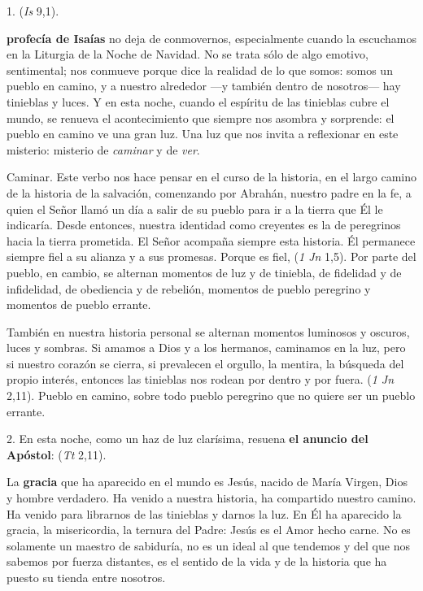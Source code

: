 \begin{body}
	1.  (\emph{Is} 9,1).
	
	 \textbf{profecía de Isaías} no deja de conmovernos, especialmente cuando la escuchamos en la Liturgia de la Noche de Navidad. No se trata sólo de algo emotivo, sentimental; nos conmueve porque dice la realidad de lo que somos: somos un pueblo en camino, y a nuestro alrededor ---y también dentro de nosotros--- hay tinieblas y luces. Y en esta noche, cuando el espíritu de las tinieblas cubre el mundo, se renueva el acontecimiento que siempre nos asombra y sorprende: el pueblo en camino ve una gran luz. Una luz que nos invita a reflexionar en este misterio: misterio de \emph{caminar} y de \emph{ver}.
	
	Caminar. Este verbo nos hace pensar en el curso de la historia, en el largo camino de la historia de la salvación, comenzando por Abrahán, nuestro padre en la fe, a quien el Señor llamó un día a salir de su pueblo para ir a la tierra que Él le indicaría. Desde entonces, nuestra identidad como creyentes es la de peregrinos hacia la tierra prometida. El Señor acompaña siempre esta historia. Él permanece siempre fiel a su alianza y a sus promesas. Porque es fiel,  (\emph{1 Jn} 1,5). Por parte del pueblo, en cambio, se alternan momentos de luz y de tiniebla, de fidelidad y de infidelidad, de obediencia y de rebelión, momentos de pueblo peregrino y momentos de pueblo errante.
	
	También en nuestra historia personal se alternan momentos luminosos y oscuros, luces y sombras. Si amamos a Dios y a los hermanos, caminamos en la luz, pero si nuestro corazón se cierra, si prevalecen el orgullo, la mentira, la búsqueda del propio interés, entonces las tinieblas nos rodean por dentro y por fuera.  (\emph{1 Jn} 2,11). Pueblo en camino, sobre todo pueblo peregrino que no quiere ser un pueblo errante.
	
	2. En esta noche, como un haz de luz clarísima, resuena \textbf{el anuncio del Apóstol}:  (\emph{Tt} 2,11).
	
	La \textbf{gracia} que ha aparecido en el mundo es Jesús, nacido de María Virgen, Dios y hombre verdadero. Ha venido a nuestra historia, ha compartido nuestro camino. Ha venido para librarnos de las tinieblas y darnos la luz. En Él ha aparecido la gracia, la misericordia, la ternura del Padre: Jesús es el Amor hecho carne. No es solamente un maestro de sabiduría, no es un ideal al que tendemos y del que nos sabemos por fuerza distantes, es el sentido de la vida y de la historia que ha puesto su tienda entre nosotros.
	

\end{body}
